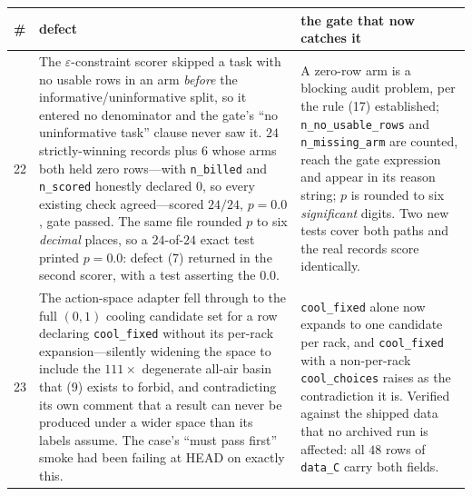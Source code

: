 \documentclass{article}
\begin{document}
\begin{table}[p]
\centering
\small\sloppy
\setlength{\tabcolsep}{4pt}
\begin{tabular}{@{}p{0.6cm}p{7.3cm}p{7.3cm}@{}}
\toprule
\# & defect & the gate that now catches it \\
\midrule
22 & The $\varepsilon$-constraint scorer skipped a task with no usable rows in an arm \emph{before} the informative/uninformative split, so it entered no denominator and the gate's ``no uninformative task'' clause never saw it.  $24$ strictly-winning records plus $6$ whose arms both held zero rows---with \texttt{n\_billed} and \texttt{n\_scored} honestly declared $0$, so every existing check agreed---scored $24/24$, $p = 0.0$, gate passed.  The same file rounded $p$ to six \emph{decimal} places, so a $24$-of-$24$ exact test printed $p = 0.0$: defect (7) returned in the second scorer, with a test asserting the $0.0$. & A zero-row arm is a blocking audit problem, per the rule (17) established; \texttt{n\_no\_usable\_rows} and \texttt{n\_missing\_arm} are counted, reach the gate expression and appear in its reason string; $p$ is rounded to six \emph{significant} digits.  Two new tests cover both paths and the real records score identically. \\
23 & The action-space adapter fell through to the full $(0,1)$ cooling candidate set for a row declaring \texttt{cool\_fixed} without its per-rack expansion---silently widening the space to include the $111\times$ degenerate all-air basin that (9) exists to forbid, and contradicting its own comment that a result can never be produced under a wider space than its labels assume.  The case's ``must pass first'' smoke had been failing at HEAD on exactly this. & \texttt{cool\_fixed} alone now expands to one candidate per rack, and \texttt{cool\_fixed} with a non-per-rack \texttt{cool\_choices} raises as the contradiction it is.  Verified against the shipped data that no archived run is affected: all $48$ rows of \texttt{data\_C} carry both fields. \\

\end{tabular}
\end{table}
\end{document}
